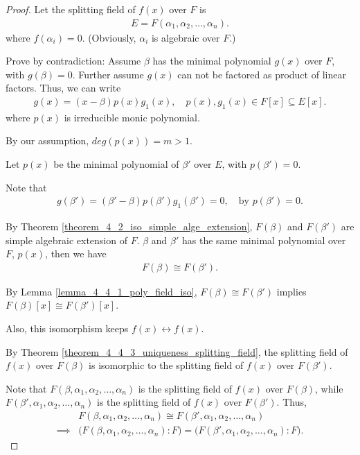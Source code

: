 \documentclass[utf8]{ctexbook}
\begin{document}
\begin{proof}
Let the splitting field of $f(x)$ over $F$ is
\begin{align*}
E = F(\alpha_1 , \alpha_2, \ldots, \alpha_n).
\end{align*}
where $f(\alpha_i) = 0$. (Obviously, $\alpha_i$ is algebraic over $F$.)

Prove by contradiction: Assume $\beta$ has the minimal polynomial $g(x)$ over $F$, with $g(\beta)=0$. Further assume $g(x)$ can not be factored as product of linear factors. Thus, we can write
\begin{align*}
g(x) = (x- \beta) p(x) g_1 (x), \quad p(x), g_1 (x) \in F[x] \subseteq E[x].
\end{align*}
where $p(x)$ is irreducible monic polynomial.

By our assumption, $deg(p(x)) = m > 1$.

Let $p(x)$ be the minimal polynomial of $\beta'$ over $E$, with $p(\beta') = 0$. 

Note that
\begin{align*}
g(\beta') = (\beta' - \beta) p(\beta') g_1 (\beta') = 0, \quad \mbox{by } p(\beta') = 0 .
\end{align*}

By Theorem \ref{theorem_4_2_iso_simple_alge_extension}, $F(\beta)$ and $F(\beta')$ are simple algebraic extension of $F$. $\beta$ and $\beta'$ has the same minimal polynomial over $F$, $p(x)$, then we have
\begin{align*}
F(\beta) \cong F(\beta') .
\end{align*}

By Lemma \ref{lemma_4_4_1_poly_field_iso}, $F(\beta) \cong F(\beta')$ implies $F(\beta)[x] \cong F(\beta')[x]$. 

Also, this isomorphism keeps $f(x) \longleftrightarrow f(x)$.

By Theorem \ref{theorem_4_4_3_uniqueness_splitting_field}, the splitting field of $f(x)$ over $F(\beta)$ is isomorphic to the splitting field of $f(x)$ over $F(\beta')$.

Note that $F(\beta, \alpha_1, \alpha_2, \ldots, \alpha_n)$ is the splitting field of $f(x)$ over $F(\beta)$, while $F(\beta', \alpha_1, \alpha_2, \ldots, \alpha_n)$ is the splitting field of $f(x)$ over $F(\beta')$. Thus,
\begin{align*}
& F(\beta, \alpha_1, \alpha_2, \ldots, \alpha_n) \cong F(\beta', \alpha_1, \alpha_2, \ldots, \alpha_n) \\
\implies & \big( F(\beta, \alpha_1, \alpha_2, \ldots, \alpha_n) : F\big)  = \big( F(\beta', \alpha_1, \alpha_2, \ldots, \alpha_n) : F \big) .
\end{align*} 


\end{proof}
\end{document}
